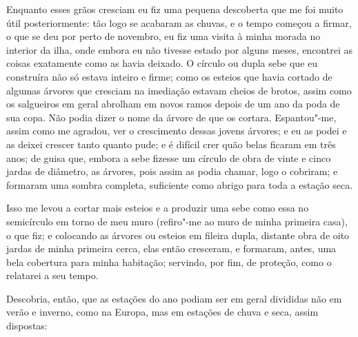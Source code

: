 Enquanto esses grãos cresciam eu fiz uma pequena descoberta que me foi
muito útil posteriormente: tão logo se acabaram as chuvas, e o tempo
começou a firmar, o que se deu por perto de novembro, eu fiz uma visita
à minha morada no interior da ilha, onde embora eu não tivesse estado
por alguns meses, encontrei as coisas exatamente como as havia deixado.
O círculo ou dupla sebe que eu construíra não só estava inteiro e firme;
como os esteios que havia cortado de algumas árvores que cresciam na
imediação estavam cheios de brotos, assim como os salgueiros em geral
abrolham em novos ramos depois de um ano da poda de sua copa. Não podia
dizer o nome da árvore de que os cortara. Espantou"-me, assim como me
agradou, ver o crescimento dessas jovens árvores; e eu as podei e as
deixei crescer tanto quanto pude; e é difícil crer quão belas ficaram em
três anos; de guisa que, embora a sebe fizesse um círculo de obra de
vinte e cinco jardas de diâmetro, as árvores, pois assim as podia
chamar, logo o cobriram; e formaram uma sombra completa, suficiente como
abrigo para toda a estação seca.

Isso me levou a cortar mais esteios e a produzir uma sebe como essa no
semicírculo em torno de meu muro (refiro"-me ao muro de minha primeira
casa), o que fiz; e colocando as árvores ou esteios em fileira dupla,
distante obra de oito jardas de minha primeira cerca, elas então
cresceram, e formaram, antes, uma bela cobertura para minha habitação;
servindo, por fim, de proteção, como o relatarei a seu tempo.

Descobria, então, que as estações do ano podiam ser em geral divididas
não em verão e inverno, como na Europa, mas em estações de chuva e seca,
assim dispostas:

